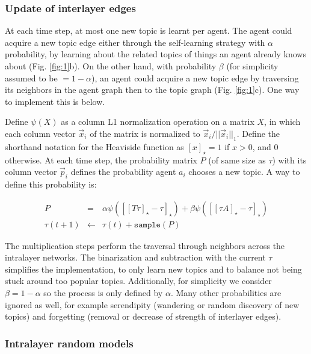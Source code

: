 \documentclass{svproc}
\begin{document}
\vspace{-1em}
\subsubsection*{Update of interlayer edges}

At each time step, at most one new topic is learnt per agent.
The agent could acquire a new topic edge either through the self-learning strategy with $\alpha$ probability, by learning about the related topics of things an agent already knows about (Fig. \ref{fig:1}b).
On the other hand, with probability $\beta$ (for simplicity assumed to be $=1 - \alpha$), an agent could acquire a new topic edge by traversing its neighbors in the agent graph then to the topic graph (Fig. \ref{fig:1}c).
One way to implement this is below.

Define $\psi(X)$ as a column L1 normalization operation on a matrix $X$, in which each column vector $\vec{x}_i$ of the matrix is normalized to $\vec{x}_i/||\vec{x}_i||_1$.
Define the shorthand notation for the Heaviside function as $[x]_{\star} = 1$ if $x > 0$, and $0$ otherwise.
At each time step, the probability matrix $P$ (of same size as $\tau$) with its column vector $\vec{p}_i$ defines the probability agent $a_i$ chooses a new topic. A way to define this probability is:

\vspace{-1em}
\begin{eqnarray}
    P &=&
    \alpha \psi\left(\left[\left[T\tau\right]_{\star} - \tau \right]_{\star}\right) +
    \beta \psi\left(\left[\left[\tau A\right]_{\star} - \tau \right]_{\star}\right)
    \label{eq:1}
    \\
    \tau(t+1) &\leftarrow& \tau(t) + \texttt{sample}(P)
    \label{eq:2}
\end{eqnarray}

The multiplication steps perform the traversal through neighbors across the intralayer networks.
The binarization and subtraction with the current $\tau$ simplifies the implementation, to only learn new topics and to balance not being stuck around too popular topics.
Additionally, for simplicity we consider $\beta = 1 - \alpha$ so the process is only defined by $\alpha$.
Many other probabilities are ignored as well, for example serendipity (wandering or random discovery of new topics) and forgetting (removal or decrease of strength of interlayer edges).

\vspace{-1em}
\subsubsection*{Intralayer random models}
\end{document}
